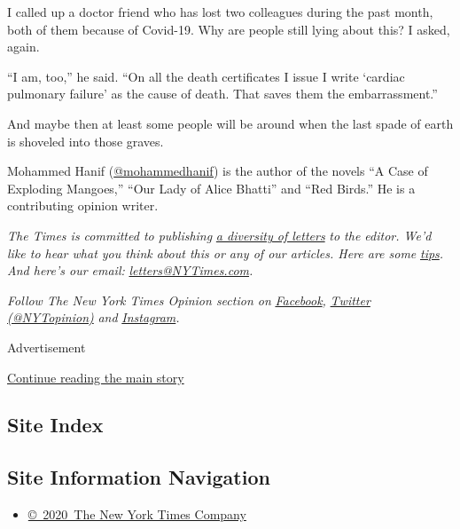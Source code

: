 I called up a doctor friend who has lost two colleagues during the past
month, both of them because of Covid-19. Why are people still lying
about this? I asked, again.

``I am, too,'' he said. ``On all the death certificates I issue I write
`cardiac pulmonary failure' as the cause of death. That saves them the
embarrassment.''

And maybe then at least some people will be around when the last spade
of earth is shoveled into those graves.

Mohammed Hanif
(\href{https://twitter.com/mohammedhanif}{@mohammedhanif}) is the author
of the novels ``A Case of Exploding Mangoes,'' ``Our Lady of Alice
Bhatti'' and ``Red Birds.'' He is a contributing opinion writer.

\emph{The Times is committed to publishing}
\href{https://www.nytimes3xbfgragh.onion/2019/01/31/opinion/letters/letters-to-editor-new-york-times-women.html}{\emph{a
diversity of letters}} \emph{to the editor. We'd like to hear what you
think about this or any of our articles. Here are some}
\href{https://help.nytimes3xbfgragh.onion/hc/en-us/articles/115014925288-How-to-submit-a-letter-to-the-editor}{\emph{tips}}\emph{.
And here's our email:}
\href{mailto:letters@NYTimes.com}{\emph{letters@NYTimes.com}}\emph{.}

\emph{Follow The New York Times Opinion section on}
\href{https://www.facebookcorewwwi.onion/nytopinion}{\emph{Facebook}}\emph{,}
\href{http://twitter.com/NYTOpinion}{\emph{Twitter (@NYTopinion)}}
\emph{and}
\href{https://www.instagram.com/nytopinion/}{\emph{Instagram}}\emph{.}

Advertisement

\protect\hyperlink{after-bottom}{Continue reading the main story}

\hypertarget{site-index}{%
\subsection{Site Index}\label{site-index}}

\hypertarget{site-information-navigation}{%
\subsection{Site Information
Navigation}\label{site-information-navigation}}

\begin{itemize}
\tightlist
\item
  \href{https://help.nytimes3xbfgragh.onion/hc/en-us/articles/115014792127-Copyright-notice}{©~2020~The
  New York Times Company}
\end{itemize}

